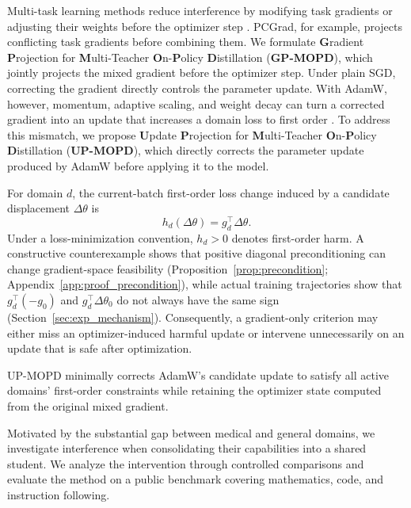 \documentclass{article}
\begin{document}
Multi-task learning methods reduce interference by modifying task gradients or adjusting their weights before the optimizer step \citep{ref25,ref26,ref34,ref27,ref28}.
PCGrad, for example, projects conflicting task gradients before combining them.
We formulate \textbf{G}radient \textbf{P}rojection for \textbf{M}ulti-Teacher \textbf{O}n-\textbf{P}olicy \textbf{D}istillation (\textbf{GP-MOPD}), which jointly projects the mixed gradient before the optimizer step.
Under plain SGD, correcting the gradient directly controls the parameter update.
With AdamW, however, momentum, adaptive scaling, and weight decay can turn a corrected gradient into an update that increases a domain loss to first order \citep{ref4,ref5}.
To address this mismatch, we propose \textbf{U}pdate \textbf{P}rojection for \textbf{M}ulti-Teacher \textbf{O}n-\textbf{P}olicy \textbf{D}istillation (\textbf{UP-MOPD}), which directly corrects the parameter update produced by AdamW before applying it to the model.

For domain $d$, the current-batch first-order loss change induced by a candidate displacement $\Delta\theta$ is
\[
h_d(\Delta\theta)=g_d^\top\Delta\theta.
\]
Under a loss-minimization convention, $h_d>0$ denotes first-order harm. A constructive counterexample shows that positive diagonal preconditioning can change gradient-space feasibility (Proposition~\ref{prop:precondition}; Appendix~\ref{app:proof_precondition}), while actual training trajectories show that $g_d^\top(-g_0)$ and $g_d^\top\Delta\theta_0$ do not always have the same sign (Section~\ref{sec:exp_mechanism}). Consequently, a gradient-only criterion may either miss an optimizer-induced harmful update or intervene unnecessarily on an update that is safe after optimization.

UP-MOPD minimally corrects AdamW's candidate update to satisfy all active domains' first-order constraints while retaining the optimizer state computed from the original mixed gradient.

Motivated by the substantial gap between medical and general domains, we investigate interference when consolidating their capabilities into a shared student. We analyze the intervention through controlled comparisons and evaluate the method on a public benchmark covering mathematics, code, and instruction following.
\end{document}
